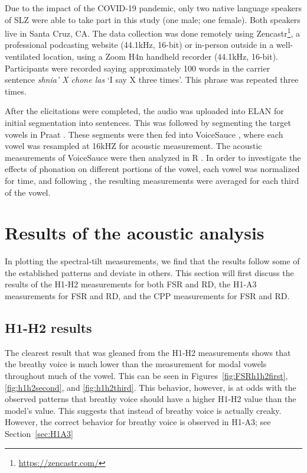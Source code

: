 \documentclass[12pt, letterpaper]{article}
\begin{document}
Due to the impact of the COVID-19 pandemic, only two native language speakers of SLZ were able to take part in this study (one male; one female). Both speakers live in Santa Cruz, CA. The data collection was done remotely using Zencastr\footnote{\href{https://zencastr.com/}{https://zencastr.com/}}, a professional podcasting website (44.1kHz, 16-bit) or in-person outside in a well-ventilated location, using a Zoom H4n handheld recorder (44.1kHz, 16-bit). Participants were recorded saying approximately 100 words in the carrier sentence \textit{shnia' X chone las} `I say X three times'. This phrase was repeated three times. 

After the elicitations were completed, the audio was uploaded into ELAN \citep{wittenburgELANProfessionalFramework2006} for initial segmentation into sentences. This was followed by segmenting the target vowels in Praat \citep{boersmaPraatDoingPhonetics2021}. These segments were then fed into VoiceSauce \citep{shueVOICESAUCEProgramVoice2009}, where each vowel was resampled at 16kHZ for acoustic measurement. The acoustic measurements of VoiceSauce were then analyzed in R \citep{rcoreteamLanguageEnvironmentStatistical2021}. In order to investigate the effects of phonation on different portions of the vowel, each vowel was normalized for time, and following \citet{garellekAcousticConsequencesPhonation2011}, the resulting measurements were averaged for each third of the vowel. 

\section{Results of the acoustic analysis} \label{sec:Results}

In plotting the spectral-tilt measurements, we find that the results follow some of the established patterns and deviate in others. This section will first discuss the results of the H1-H2 measurements for both FSR and RD, the H1-A3 measurements for FSR and RD, and the CPP measurements for FSR and RD. 

\subsection{H1-H2 results} \label{sec:H1H2}

The clearest result that was gleaned from the H1-H2 measurements shows that the breathy voice is much lower than the measurement for modal vowels throughout much of the vowel. This can be seen in Figures~\ref{fig:FSRh1h2first}, \ref{fig:h1h2second}, and \ref{fig:h1h2third}. This behavior, however, is at odds with the observed patterns that breathy voice should have a higher H1-H2 value than the model's value. This suggests that instead of breathy voice is actually creaky. However, the correct behavior for breathy voice is observed in H1-A3; see Section~\ref{sec:H1A3}
\end{document}
